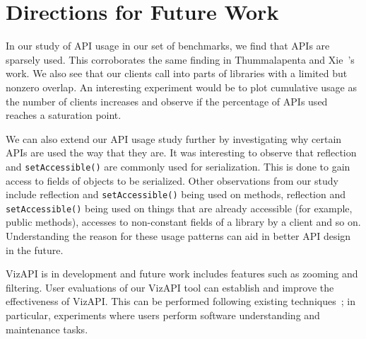 \section{Directions for Future Work}
In our study of API usage in our set of benchmarks, we find that APIs are sparsely used. 
This corroborates the same finding in Thummalapenta and Xie~\cite{thummalapenta08:_spotw}'s work.
We also see that our clients call into parts of libraries with a limited but nonzero overlap. 
An interesting experiment would be to plot cumulative usage as the number of clients increases and observe if the percentage of APIs used reaches a saturation
point.

We can also extend our API usage study further by investigating why certain APIs are used the way that they are. 
It was interesting to observe that reflection and \texttt{setAccessible()} are commonly used for serialization. This is done to gain access to fields of objects to be serialized.
Other observations from our study include reflection and \texttt{setAccessible()} being used on methods, 
reflection and \texttt{setAccessible()} being used on things that are already accessible (for example, public methods), 
accesses to non-constant fields of a library by a client and so on. Understanding the reason for these usage patterns can aid in better API design in the future.

VizAPI is in development and future work includes features such as zooming and filtering. 
User evaluations of our VizAPI tool can establish and improve the
effectiveness of VizAPI. This can be performed following
existing techniques~\cite{merino18:_system_liter_review_softw_visual_evaluat}; in
particular, experiments where users perform software
understanding and maintenance tasks.
